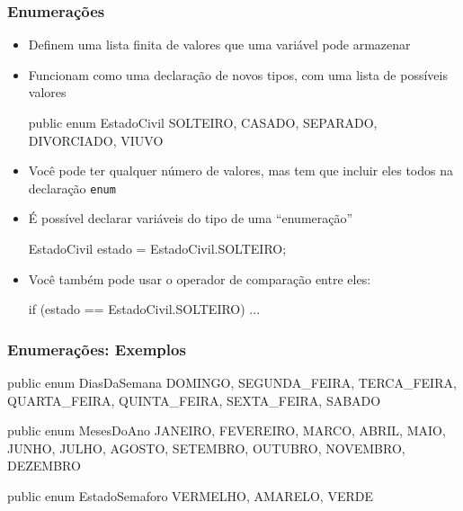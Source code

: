 \documentclass[xcolor={dvipsnames,table},aspectratio=169]{beamer}
\begin{document}
\begin{frame}[fragile]\frametitle{Enumerações}
\begin{itemize}
	\item Definem uma lista finita de valores que uma variável pode armazenar
	\item Funcionam como uma declaração de novos tipos, com uma lista de possíveis valores
{\scriptsize
\begin{javacode}
public enum EstadoCivil { 
  SOLTEIRO, CASADO, SEPARADO, DIVORCIADO, VIUVO
}
\end{javacode}
}
	\item Você pode ter qualquer número de valores, mas tem que incluir eles todos na declaração \texttt{enum}
	\item É possível declarar variáveis do tipo de uma ``enumeração''
{\scriptsize
\begin{javacode}
EstadoCivil estado = EstadoCivil.SOLTEIRO;
\end{javacode}
}
	\item Você também pode usar o operador de comparação entre eles:
{\scriptsize
\begin{javacode}
if (estado == EstadoCivil.SOLTEIRO) ... 
\end{javacode}
}
\end{itemize}
\end{frame}

\begin{frame}[fragile]\frametitle{Enumerações: Exemplos}

\begin{javacode}
public enum DiasDaSemana { 
  DOMINGO, SEGUNDA_FEIRA, TERCA_FEIRA, QUARTA_FEIRA,
  QUINTA_FEIRA, SEXTA_FEIRA, SABADO
}

public enum MesesDoAno {
  JANEIRO, FEVEREIRO, MARCO, ABRIL, MAIO, JUNHO,
  JULHO, AGOSTO, SETEMBRO, OUTUBRO, NOVEMBRO, DEZEMBRO
}

public enum EstadoSemaforo {
  VERMELHO, AMARELO, VERDE
}
\end{javacode}
\end{frame}
\end{document}

